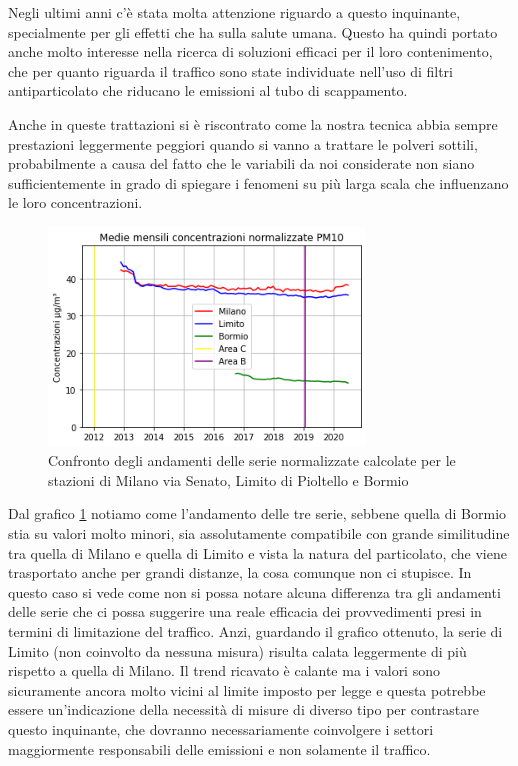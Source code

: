 Negli ultimi anni c'è stata molta attenzione riguardo a questo inquinante, specialmente per gli effetti che ha sulla salute umana.
Questo ha quindi portato anche molto interesse nella ricerca di soluzioni efficaci per il loro contenimento, che per quanto riguarda il traffico sono state individuate nell'uso di filtri antiparticolato che riducano le emissioni al tubo di scappamento. 

Anche in queste trattazioni si è riscontrato come la nostra tecnica abbia sempre prestazioni leggermente peggiori quando si vanno a trattare le polveri sottili, probabilmente a causa del fatto che le variabili da noi considerate non siano sufficientemente in grado di spiegare i fenomeni su più larga scala che influenzano le loro concentrazioni.

\begin{figure}[h]
\centering
\includegraphics[width=0.75\textwidth]{pm10_traffico}
\caption{Confronto degli andamenti delle serie normalizzate calcolate per le stazioni di Milano via Senato, Limito di Pioltello e Bormio}
\label{fig:pm10_traffico}
\end{figure}

Dal grafico \ref{fig:pm10_traffico} notiamo come l'andamento delle tre serie, sebbene quella di Bormio stia su valori molto minori, sia assolutamente compatibile con grande similitudine tra quella di Milano e quella di Limito e vista la natura del particolato, che viene trasportato anche per grandi distanze, la cosa comunque non ci stupisce. In questo caso si vede come non si possa notare alcuna differenza tra gli andamenti delle serie che ci possa suggerire una reale efficacia dei provvedimenti presi in termini di limitazione del traffico. Anzi, guardando il grafico ottenuto, la serie di Limito (non coinvolto da nessuna misura) risulta calata leggermente di più rispetto a quella di Milano.
Il trend ricavato è calante ma i valori sono sicuramente ancora molto vicini al limite imposto per legge e questa potrebbe essere un'indicazione della necessità di misure di diverso tipo per contrastare questo inquinante, che dovranno necessariamente coinvolgere i settori maggiormente responsabili delle emissioni e non solamente il traffico.

